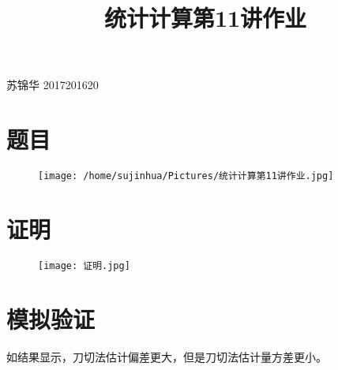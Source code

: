 \documentclass[]{article}
\title{统计计算第11讲作业}
\author{}
\date{\vspace{-2.5em}}
\begin{document}
\maketitle

苏锦华 2017201620

\section{题目}\label{ux9898ux76ee}

\begin{figure}
\centering
\texttt{[image: /home/sujinhua/Pictures/统计计算第11讲作业.jpg]}
\caption{}
\end{figure}

\section{证明}\label{ux8bc1ux660e}

\begin{figure}
\centering
\texttt{[image: 证明.jpg]}
\caption{}
\end{figure}

\section{模拟验证}\label{ux6a21ux62dfux9a8cux8bc1}

如结果显示，刀切法估计偏差更大，但是刀切法估计量方差更小。
\end{document}
